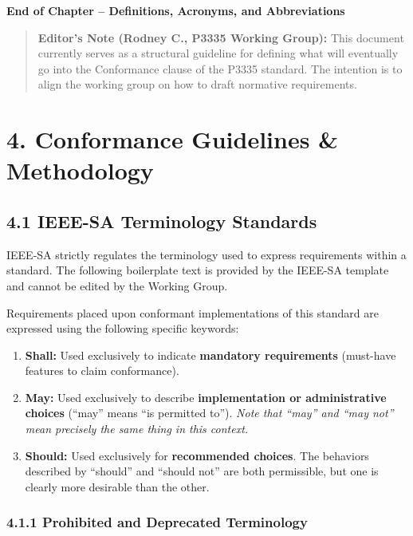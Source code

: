 \documentclass[
]{article}
\begin{document}
\textbf{End of Chapter -- Definitions, Acronyms, and Abbreviations}

\begin{quote}
\textbf{Editor's Note (Rodney C., P3335 Working Group):} This document
currently serves as a structural guideline for defining what will
eventually go into the Conformance clause of the P3335 standard. The
intention is to align the working group on how to draft normative
requirements.
\end{quote}

\section{4. Conformance Guidelines \&
Methodology}\label{conformance-guidelines-methodology}

\subsection{4.1 IEEE-SA Terminology
Standards}\label{ieee-sa-terminology-standards}

IEEE-SA strictly regulates the terminology used to express requirements
within a standard. The following boilerplate text is provided by the
IEEE-SA template and cannot be edited by the Working Group.

Requirements placed upon conformant implementations of this standard are
expressed using the following specific keywords:

\begin{enumerate}
\item
  \textbf{Shall:} Used exclusively to indicate \textbf{mandatory
  requirements} (must-have features to claim conformance).
\item
  \textbf{May:} Used exclusively to describe \textbf{implementation or
  administrative choices} (``may'' means ``is permitted to'').
  \emph{Note that ``may'' and ``may not'' mean precisely the same thing
  in this context.}
\item
  \textbf{Should:} Used exclusively for \textbf{recommended choices}.
  The behaviors described by ``should'' and ``should not'' are both
  permissible, but one is clearly more desirable than the other.
\end{enumerate}

\subsubsection{4.1.1 Prohibited and Deprecated
Terminology}\label{prohibited-and-deprecated-terminology}
\end{document}
